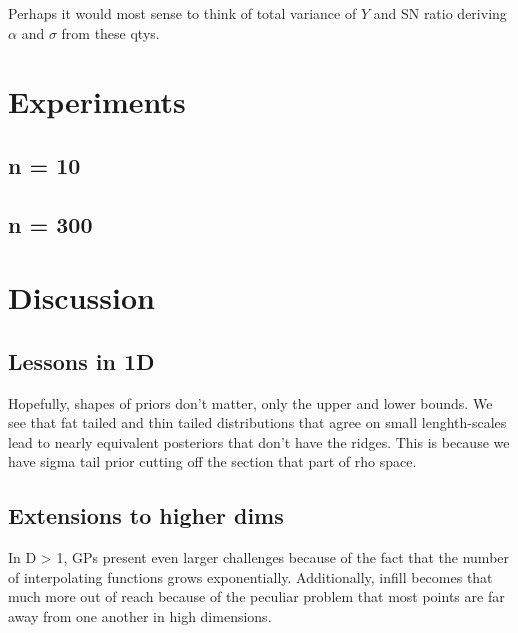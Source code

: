 \documentclass{article}
\begin{document}
Perhaps it would most sense to think of total variance of $Y$ and SN ratio
deriving $\alpha$ and $\sigma$ from these qtys.

\section{Experiments}

\subsection{n = 10}

\subsection{n = 300}

\section{Discussion}

\subsection{Lessons in 1D}

Hopefully, shapes of priors don't matter, only the upper and lower bounds. We
see that fat tailed and thin tailed distributions that agree on small
lenghth-scales lead to nearly equivalent posteriors that don't have the ridges.
This is because we have sigma tail prior cutting off the section that part of
rho space.

\subsection{Extensions to higher dims}

In D > 1, GPs present even larger challenges because of the fact that the
number of interpolating functions grows exponentially. Additionally, 
infill becomes that much more out of reach because of the peculiar
problem that most points are far away from one another in high dimensions.


%


\end{document}
